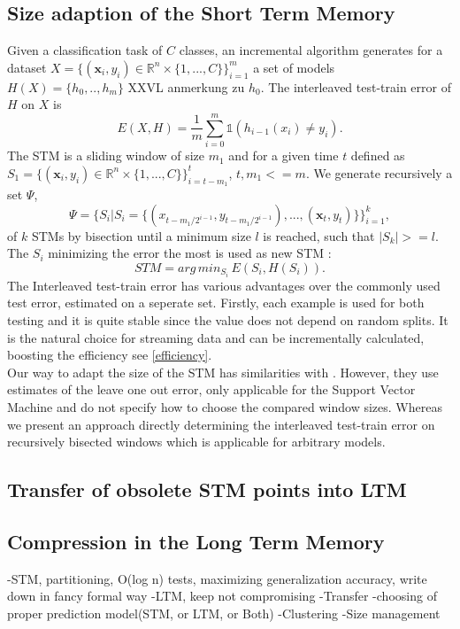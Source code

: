 \documentclass[conference]{IEEEtran}
\begin{document}
\subsection{Size adaption of the Short Term Memory}
Given a classification task of $C$ classes, an incremental algorithm generates for a dataset $X= \{ (\mathbf{x}_i,y_i) \in \mathbb{R}^n \times \{1,...,C\}\}_{i=1}^m$
a set of models $H(X)=\{h_0,..,h_{m}\}$ XXVL anmerkung zu $h_0$. The interleaved test-train error of $H$ on $X$ is 
\begin{equation*}
E(X, H) = \frac{1}{m}\sum_{i=0}^m \mathds{1} (h_{i-1}(x_i)\neq y_i).
\end{equation*}
The STM is a sliding window of size $m_1$ and for a given time $t$ defined as 
$S_1= \{ (\mathbf{x}_i,y_i) \in \mathbb{R}^n \times \{1,...,C\}\}_{i=t-m_1}^{t}$, $t, m_1<=m$.
We generate recursively a set $\Psi$, 
\begin{equation*}
\Psi=\{S_i|S_i=\{(x_{t-m_1/2^{i-1}},y_{t-m_1/2^{i-1}}),...,(\mathbf{x}_t,y_t)\}\}_{i=1}^k,
\end{equation*}
of $k$ STMs by bisection until a minimum size $l$ is reached, such that $|S_k|>=l$.
The $S_i$ minimizing the error the most is used as new STM :
\begin{equation*}
STM = arg\,min_{S_i}\,E(S_i, H(S_i)).
\end{equation*}
The Interleaved test-train error has various advantages over the commonly used test error, estimated on a seperate set. Firstly, each example is used for both testing and 
it is quite stable since the value does not depend on random splits. It is the natural choice for streaming data and can be incrementally calculated, boosting the efficiency see \ref{efficiency}.\\
Our way to adapt the size of the STM has similarities with \cite{klinkenberg2000detecting}. However, they use estimates of the leave one out error, only applicable for the Support Vector Machine
and do not specify how to choose the compared window sizes. Whereas we present an approach directly determining the interleaved test-train error on recursively bisected windows which is applicable for arbitrary models. 
\subsection{Transfer of obsolete STM points into LTM}

\subsection{Compression in the Long Term Memory}
-STM, partitioning, O(log n) tests, maximizing generalization accuracy, write down in fancy formal way
-LTM, keep not compromising
-Transfer
-choosing of proper prediction model(STM, or LTM, or Both)
-Clustering
-Size management
\end{document}
